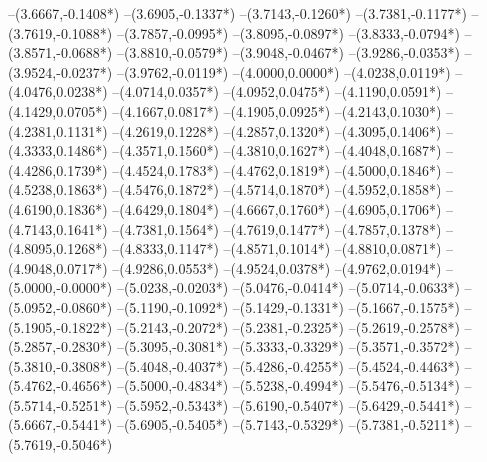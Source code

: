 {	--(3.6667,{-0.1408*\yskala})
	--(3.6905,{-0.1337*\yskala})
	--(3.7143,{-0.1260*\yskala})
	--(3.7381,{-0.1177*\yskala})
	--(3.7619,{-0.1088*\yskala})
	--(3.7857,{-0.0995*\yskala})
	--(3.8095,{-0.0897*\yskala})
	--(3.8333,{-0.0794*\yskala})
	--(3.8571,{-0.0688*\yskala})
	--(3.8810,{-0.0579*\yskala})
	--(3.9048,{-0.0467*\yskala})
	--(3.9286,{-0.0353*\yskala})
	--(3.9524,{-0.0237*\yskala})
	--(3.9762,{-0.0119*\yskala})
	--(4.0000,{0.0000*\yskala})
	--(4.0238,{0.0119*\yskala})
	--(4.0476,{0.0238*\yskala})
	--(4.0714,{0.0357*\yskala})
	--(4.0952,{0.0475*\yskala})
	--(4.1190,{0.0591*\yskala})
	--(4.1429,{0.0705*\yskala})
	--(4.1667,{0.0817*\yskala})
	--(4.1905,{0.0925*\yskala})
	--(4.2143,{0.1030*\yskala})
	--(4.2381,{0.1131*\yskala})
	--(4.2619,{0.1228*\yskala})
	--(4.2857,{0.1320*\yskala})
	--(4.3095,{0.1406*\yskala})
	--(4.3333,{0.1486*\yskala})
	--(4.3571,{0.1560*\yskala})
	--(4.3810,{0.1627*\yskala})
	--(4.4048,{0.1687*\yskala})
	--(4.4286,{0.1739*\yskala})
	--(4.4524,{0.1783*\yskala})
	--(4.4762,{0.1819*\yskala})
	--(4.5000,{0.1846*\yskala})
	--(4.5238,{0.1863*\yskala})
	--(4.5476,{0.1872*\yskala})
	--(4.5714,{0.1870*\yskala})
	--(4.5952,{0.1858*\yskala})
	--(4.6190,{0.1836*\yskala})
	--(4.6429,{0.1804*\yskala})
	--(4.6667,{0.1760*\yskala})
	--(4.6905,{0.1706*\yskala})
	--(4.7143,{0.1641*\yskala})
	--(4.7381,{0.1564*\yskala})
	--(4.7619,{0.1477*\yskala})
	--(4.7857,{0.1378*\yskala})
	--(4.8095,{0.1268*\yskala})
	--(4.8333,{0.1147*\yskala})
	--(4.8571,{0.1014*\yskala})
	--(4.8810,{0.0871*\yskala})
	--(4.9048,{0.0717*\yskala})
	--(4.9286,{0.0553*\yskala})
	--(4.9524,{0.0378*\yskala})
	--(4.9762,{0.0194*\yskala})
	--(5.0000,{-0.0000*\yskala})
	--(5.0238,{-0.0203*\yskala})
	--(5.0476,{-0.0414*\yskala})
	--(5.0714,{-0.0633*\yskala})
	--(5.0952,{-0.0860*\yskala})
	--(5.1190,{-0.1092*\yskala})
	--(5.1429,{-0.1331*\yskala})
	--(5.1667,{-0.1575*\yskala})
	--(5.1905,{-0.1822*\yskala})
	--(5.2143,{-0.2072*\yskala})
	--(5.2381,{-0.2325*\yskala})
	--(5.2619,{-0.2578*\yskala})
	--(5.2857,{-0.2830*\yskala})
	--(5.3095,{-0.3081*\yskala})
	--(5.3333,{-0.3329*\yskala})
	--(5.3571,{-0.3572*\yskala})
	--(5.3810,{-0.3808*\yskala})
	--(5.4048,{-0.4037*\yskala})
	--(5.4286,{-0.4255*\yskala})
	--(5.4524,{-0.4463*\yskala})
	--(5.4762,{-0.4656*\yskala})
	--(5.5000,{-0.4834*\yskala})
	--(5.5238,{-0.4994*\yskala})
	--(5.5476,{-0.5134*\yskala})
	--(5.5714,{-0.5251*\yskala})
	--(5.5952,{-0.5343*\yskala})
	--(5.6190,{-0.5407*\yskala})
	--(5.6429,{-0.5441*\yskala})
	--(5.6667,{-0.5441*\yskala})
	--(5.6905,{-0.5405*\yskala})
	--(5.7143,{-0.5329*\yskala})
	--(5.7381,{-0.5211*\yskala})
	--(5.7619,{-0.5046*\yskala})
}
